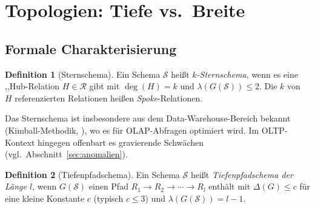 ﻿\documentclass[a4paper,12pt]{report}
\theoremstyle{definition}
\newtheorem{definition}{Definition}[chapter]
\theoremstyle{remark}
\begin{document}
\section{Topologien: Tiefe vs.\ Breite}
\label{sec:topologien}

\subsection{Formale Charakterisierung}

\begin{definition}[Sternschema]
\label{def:stern}
Ein Schema $\mathcal{S}$ heißt \emph{$k$-Sternschema}, wenn es eine
,,Hub\grqq{}-Relation $H \in \mathcal{R}$ gibt mit $\deg(H) = k$ und
$\lambda(G(\mathcal{S})) \leq 2$. Die $k$ von $H$ referenzierten Relationen
heißen \emph{Spoke}-Relationen.
\end{definition}

Das Sternschema ist insbesondere aus dem Data-Warehouse-Bereich bekannt
(Kimball-Methodik, \cite{Kimball1996}), wo es für OLAP-Abfragen optimiert
wird. Im OLTP-Kontext hingegen offenbart es gravierende Schwächen
(vgl.\ Abschnitt~\ref{sec:anomalien}).

\begin{definition}[Tiefenpfadschema]
\label{def:tiefenpfad}
Ein Schema $\mathcal{S}$ heißt \emph{Tiefenpfadschema der Länge $l$},
wenn $G(\mathcal{S})$ einen Pfad $R_1 \to R_2 \to \cdots \to R_l$
enthält mit $\Delta(G) \leq c$ für eine kleine Konstante $c$ (typisch $c \leq 3$)
und $\lambda(G(\mathcal{S})) = l - 1$.
\end{definition}
\end{document}
